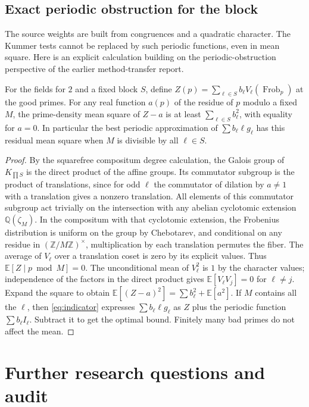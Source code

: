 \documentclass[11pt,letterpaper]{article}
\theoremstyle{definition}\newtheorem{definition}[theorem]{Definition}
\theoremstyle{remark}\newtheorem{remark}[theorem]{Remark}
\newcommand{\Q}{\mathbb Q}\newcommand{\C}{\mathbb C}\newcommand{\R}{\mathbb R}\newcommand{\F}{\mathbb F}\newcommand{\ord}{\operatorname{ord}}\newcommand{\Li}{\operatorname{Li}}\newcommand{\Gal}{\operatorname{Gal}}\newcommand{\Res}{\operatorname{Res}}\newcommand{\ind}{\operatorname{Ind}}\newcommand{\one}{\mathbf 1}
\begin{document}
\subsection{Exact periodic obstruction for the block}
The source weights are built from congruences and a quadratic character. The Kummer tests cannot be replaced by such periodic functions, even in mean square. Here is an explicit calculation building on the periodic-obstruction perspective of the earlier method-transfer report.
\begin{proposition}\label{prop:periodic}
For the fields for $2$ and a fixed block $S$, define $Z(p)=\sum_{\ell\in S}b_\ell V_\ell(\operatorname{Frob}_p)$ at the good primes. For any real function $a(p)$ of the residue of $p$ modulo a fixed $M$, the prime-density mean square of $Z-a$ is at least $\sum_{\ell\in S} b_\ell^2$, with equality for $a=0$. In particular the best periodic approximation of $\sum b_\ell\ell g_\ell$ has this residual mean square when $M$ is divisible by all $\ell\in S$.
\end{proposition}
\begin{proof}
By the squarefree compositum degree calculation, the Galois group of $K_{\prod S}$ is the direct product of the affine groups. Its commutator subgroup is the product of translations, since for odd $\ell$ the commutator of dilation by $a\ne1$ with a translation gives a nonzero translation. All elements of this commutator subgroup act trivially on the intersection with any abelian cyclotomic extension $\Q(\zeta_M)$. In the compositum with that cyclotomic extension, the Frobenius distribution is uniform on the group by Chebotarev, and conditional on any residue in $(\mathbb Z/M\mathbb Z)^\times$, multiplication by each translation permutes the fiber. The average of $V_\ell$ over a translation coset is zero by its explicit values. Thus $\mathbb E[Z\mid p\bmod M]=0$. The unconditional mean of $V_\ell^2$ is $1$ by the character values; independence of the factors in the direct product gives $\mathbb E[V_\ell V_j]=0$ for $\ell\ne j$. Expand the square to obtain $\mathbb E[(Z-a)^2]=\sum b_\ell^2+\mathbb E[a^2]$. If $M$ contains all the $\ell$, then \eqref{eq:indicator} expresses $\sum b_\ell\ell g_\ell$ as $Z$ plus the periodic function $\sum b_\ell I_\ell$. Subtract it to get the optimal bound. Finitely many bad primes do not affect the mean.
\end{proof}

\section{Further research questions and audit}
\end{document}

